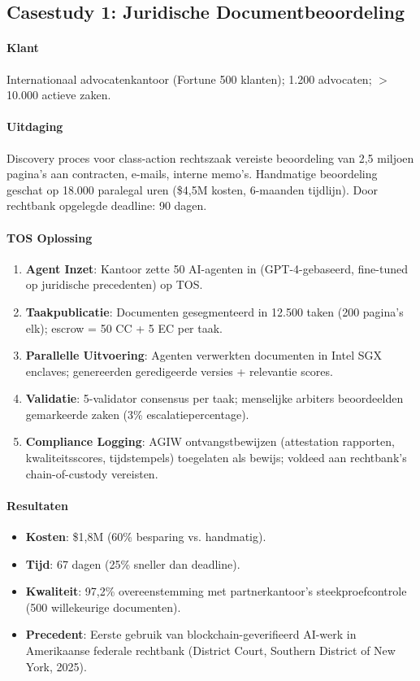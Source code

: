 \documentclass[11pt]{article}
\begin{document}
\subsection{Casestudy 1: Juridische Documentbeoordeling}

\paragraph{Klant} Internationaal advocatenkantoor (Fortune 500 klanten); 1.200 advocaten; $>$10.000 actieve zaken.

\paragraph{Uitdaging} Discovery proces voor class-action rechtszaak vereiste beoordeling van 2,5 miljoen pagina's aan contracten, e-mails, interne memo's. Handmatige beoordeling geschat op 18.000 paralegal uren (\$4,5M kosten, 6-maanden tijdlijn). Door rechtbank opgelegde deadline: 90 dagen.

\paragraph{TOS Oplossing}
\begin{enumerate}[noitemsep]
  \item \textbf{Agent Inzet}: Kantoor zette 50 AI-agenten in (GPT-4-gebaseerd, fine-tuned op juridische precedenten) op TOS.
  \item \textbf{Taakpublicatie}: Documenten gesegmenteerd in 12.500 taken (200 pagina's elk); escrow = 50 CC + 5 EC per taak.
  \item \textbf{Parallelle Uitvoering}: Agenten verwerkten documenten in Intel SGX enclaves; genereerden geredigeerde versies + relevantie scores.
  \item \textbf{Validatie}: 5-validator consensus per taak; menselijke arbiters beoordeelden gemarkeerde zaken (3\% escalatiepercentage).
  \item \textbf{Compliance Logging}: AGIW ontvangstbewijzen (attestation rapporten, kwaliteitsscores, tijdstempels) toegelaten als bewijs; voldeed aan rechtbank's chain-of-custody vereisten.
\end{enumerate}

\paragraph{Resultaten}
\begin{itemize}[noitemsep]
  \item \textbf{Kosten}: \$1,8M (60\% besparing vs. handmatig).
  \item \textbf{Tijd}: 67 dagen (25\% sneller dan deadline).
  \item \textbf{Kwaliteit}: 97,2\% overeenstemming met partnerkantoor's steekproefcontrole (500 willekeurige documenten).
  \item \textbf{Precedent}: Eerste gebruik van blockchain-geverifieerd AI-werk in Amerikaanse federale rechtbank (District Court, Southern District of New York, 2025).
\end{itemize}
\end{document}
